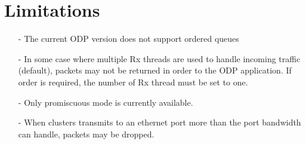 \documentclass{trkalray}
\begin{document}
\section{Limitations}

\begin{itemize}
\item[-]{The current ODP version does not support ordered queues}
\item[-]{In some case where multiple Rx threads are used to handle incoming traffic
  (default), packets may not be returned in order to the ODP
  application. If order is required, the number of Rx thread must be
  set to one.}
\item[-]{Only promiscuous mode is currently available.}
\item[-]{When clusters transmits to an ethernet port more than the port
  bandwidth can handle, packets may be dropped.}
\end{itemize}
\end{document}
